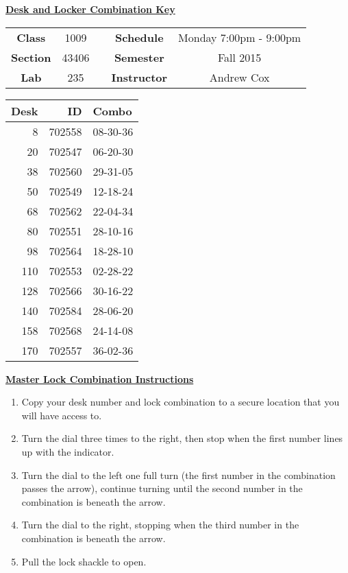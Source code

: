 \documentclass[12pt]{article}
\begin{document}
\thispagestyle{empty}

\begin{center}
	{\huge\textbf{\underline{ Desk and Locker Combination Key}}}
\end{center}


\begin{table}[h]
  \centering
  \begin{tabular}{ccccc}

  \textbf{Class} & 1009 & {\qquad} &\textbf{Schedule} & Monday 7:00pm - 9:00pm \\
  \textbf{Section} & 43406 & {\qquad} & \textbf{Semester} & Fall 2015 \\
  \textbf{Lab} & 235 & {\qquad} & \textbf{Instructor} & Andrew Cox \\
  \end{tabular}
\end{table}
 \vspace{0.5in}
\begin{minipage}{0.4\textwidth}

\begin{tabular}{rrl}
\toprule
 Desk &      ID &     Combo \\
\midrule
    8 &  702558 &  08-30-36 \\
   20 &  702547 &  06-20-30 \\
   38 &  702560 &  29-31-05 \\
   50 &  702549 &  12-18-24 \\
   68 &  702562 &  22-04-34 \\
   80 &  702551 &  28-10-16 \\
   98 &  702564 &  18-28-10 \\
  110 &  702553 &  02-28-22 \\
  128 &  702566 &  30-16-22 \\
  140 &  702584 &  28-06-20 \\
  158 &  702568 &  24-14-08 \\
  170 &  702557 &  36-02-36 \\
\bottomrule
\end{tabular}


\end{minipage}
\begin{minipage}{0.4\textwidth}
\underline{{\large \textbf{Master Lock Combination Instructions}}}
\begin{enumerate}
\item Copy your desk number and lock combination to a secure location that you will have access to.
\item Turn the dial three times to the right, then stop when the first number lines up with the indicator.
\item Turn the dial to the left one full turn (the first number in the combination passes the arrow), continue turning until the second number in the combination is beneath the arrow.
\item Turn the dial to the right, stopping when the third number in the combination is beneath the arrow.
\item Pull the lock shackle to open.
\end{enumerate}
\end{minipage}
\end{document}
